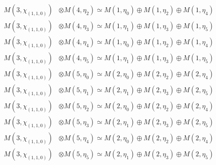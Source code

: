 \begin{align*}
M(3,\chi_{(1,1,0)}) &\otimes M(4,\eta_{2}) \simeq M(1,\eta_{0}) \oplus M(1,\eta_{2}) \oplus M(1,\eta_{4}) \\
M(3,\chi_{(1,1,0)}) &\otimes M(4,\eta_{3}) \simeq M(1,\eta_{1}) \oplus M(1,\eta_{3}) \oplus M(1,\eta_{5}) \\
M(3,\chi_{(1,1,0)}) &\otimes M(4,\eta_{4}) \simeq M(1,\eta_{0}) \oplus M(1,\eta_{2}) \oplus M(1,\eta_{4}) \\
M(3,\chi_{(1,1,0)}) &\otimes M(4,\eta_{5}) \simeq M(1,\eta_{1}) \oplus M(1,\eta_{3}) \oplus M(1,\eta_{5}) \\
M(3,\chi_{(1,1,0)}) &\otimes M(5,\eta_{0}) \simeq M(2,\eta_{0}) \oplus M(2,\eta_{2}) \oplus M(2,\eta_{4}) \\
M(3,\chi_{(1,1,0)}) &\otimes M(5,\eta_{1}) \simeq M(2,\eta_{1}) \oplus M(2,\eta_{3}) \oplus M(2,\eta_{5}) \\
M(3,\chi_{(1,1,0)}) &\otimes M(5,\eta_{2}) \simeq M(2,\eta_{0}) \oplus M(2,\eta_{2}) \oplus M(2,\eta_{4}) \\
M(3,\chi_{(1,1,0)}) &\otimes M(5,\eta_{3}) \simeq M(2,\eta_{1}) \oplus M(2,\eta_{3}) \oplus M(2,\eta_{5}) \\
M(3,\chi_{(1,1,0)}) &\otimes M(5,\eta_{4}) \simeq M(2,\eta_{0}) \oplus M(2,\eta_{2}) \oplus M(2,\eta_{4}) \\
M(3,\chi_{(1,1,0)}) &\otimes M(5,\eta_{5}) \simeq M(2,\eta_{1}) \oplus M(2,\eta_{3}) \oplus M(2,\eta_{5}) \\
\end{align*}

